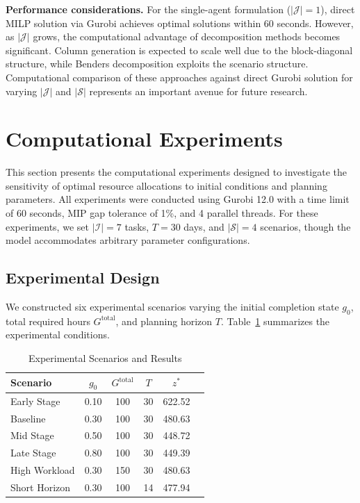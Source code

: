 \documentclass[preprint,review,11pt]{elsarticle}
\begin{document}
\textbf{Performance considerations.} For the single-agent formulation ($|\mathcal{J}| = 1$), direct MILP solution via Gurobi achieves optimal solutions within 60 seconds. However, as $|\mathcal{J}|$ grows, the computational advantage of decomposition methods becomes significant. Column generation is expected to scale well due to the block-diagonal structure, while Benders decomposition exploits the scenario structure. Computational comparison of these approaches against direct Gurobi solution for varying $|\mathcal{J}|$ and $|\mathcal{S}|$ represents an important avenue for future research.

\section{Computational Experiments}\label{sec:experiments}

This section presents the computational experiments designed to investigate the sensitivity of optimal resource allocations to initial conditions and planning parameters. All experiments were conducted using Gurobi 12.0 with a time limit of 60 seconds, MIP gap tolerance of 1\%, and 4 parallel threads. For these experiments, we set $|\mathcal{I}| = 7$ tasks, $T = 30$ days, and $|\mathcal{S}| = 4$ scenarios, though the model accommodates arbitrary parameter configurations.

\subsection{Experimental Design}

We constructed six experimental scenarios varying the initial completion state $g_0$, total required hours $G^{\text{total}}$, and planning horizon $T$. Table~\ref{tab:scenarios} summarizes the experimental conditions.

\begin{table}[htbp]
\centering
\caption{Experimental Scenarios and Results}
\label{tab:scenarios}
\begin{tabular}{lccccc}
\toprule
Scenario & $g_0$ & $G^{\text{total}}$ & $T$ & $z^*$ \\
\midrule
Early Stage & 0.10 & 100 & 30 & 622.52 \\
Baseline & 0.30 & 100 & 30 & 480.63 \\
Mid Stage & 0.50 & 100 & 30 & 448.72 \\
Late Stage & 0.80 & 100 & 30 & 449.39 \\
High Workload & 0.30 & 150 & 30 & 480.63 \\
Short Horizon & 0.30 & 100 & 14 & 477.94 \\
\bottomrule
\end{tabular}
\end{table}
\end{document}
